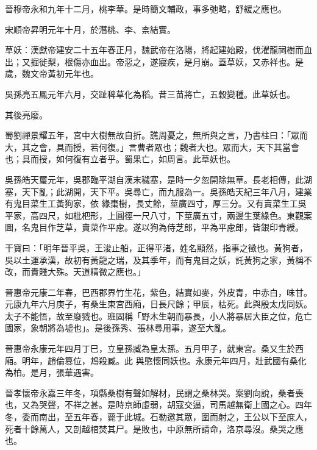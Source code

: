 \begin{pinyinscope}
 晉穆帝永和九年十二月，桃李華。是時簡文輔政，事多弛略，舒緩之應也。



 宋順帝昇明元年十月，於潛桃、李、柰結實。



 草妖：漢獻帝建安二十五年春正月，魏武帝在洛陽，將起建始殿，伐濯龍祠樹而血出；又掘徙梨，根傷亦血出。帝惡之，遂寢疾，是月崩。蓋草妖，又赤祥也。是歲，魏文帝黃初元年也。



 吳孫亮五鳳元年六月，交趾稗草化為稻。昔三苗將亡，五穀變種。此草妖也。



 其後亮廢。



 蜀劉禪景耀五年，宮中大樹無故自折。譙周憂之，無所與之言，乃書柱曰：「眾而大，其之會，具而授，若何復。」言曹者眾也；魏者大也。眾而大，天下其當會也；具而授，如何復有立者乎。蜀果亡，如周言。此草妖也。



 吳孫皓天璽元年，吳郡臨平湖自漢末穢塞，是時一夕忽開除無草。長老相傳，此湖塞，天下亂；此湖開，天下平。吳尋亡，而九服為一。吳孫皓天紀三年八月，建業有鬼目菜生工黃狗家，依
 緣棗樹，長丈餘，莖廣四寸，厚三分。又有賣菜生工吳平家，高四尺，如枇杷形，上圓徑一尺八寸，下莖廣五寸，兩邊生葉綠色。東觀案圖，名鬼目作芝草，賣菜作平慮。遂以狗為侍芝郎，平為平慮郎，皆銀印青綬。



 干寶曰：「明年晉平吳，王浚止船，正得平渚，姓名顯然，指事之徵也。黃狗者，吳以土運承漢，故初有黃龍之瑞，及其季年，而有鬼目之妖，託黃狗之家，黃稱不改，而貴賤大殊。天道精微之應也。」



 晉惠帝元康二年春，巴西郡界竹生花，紫色，結實如麥，外皮青，中赤白，味甘。元康九年六月庚子，有桑生東宮西廂，日長尺餘；甲辰，枯死。此與殷太戊同妖。太子不能悟，故至廢戮也。班固稱「野木生朝而暴長，小人將暴居大臣之位，危亡國家，象朝將為墟也」。是後孫秀、張林尋用事，遂至大亂。



 晉惠帝永康元年四月丁巳，立皇孫臧為皇太孫。五月甲子，就東宮。桑又生於西廂。明年，趙倫篡位，鴆殺臧。此
 與愍懷同妖也。永康元年四月，壯武國有桑化為柏。是月，張華遇害。



 晉孝懷帝永嘉三年冬，項縣桑樹有聲如解材，民謂之桑林哭。案劉向說，桑者喪也，又為哭聲，不祥之甚。是時京師虛弱，胡寇交逼，司馬越無衛上國之心。四年冬，委而南出，至五年春，薨于此城。石勒邀其眾，圍而射之，王公以下至庶人，死者十餘萬人，又剖越棺焚其尸。是敗也，中原無所請命，洛京尋沒。桑哭之應也。




\end{pinyinscope}
